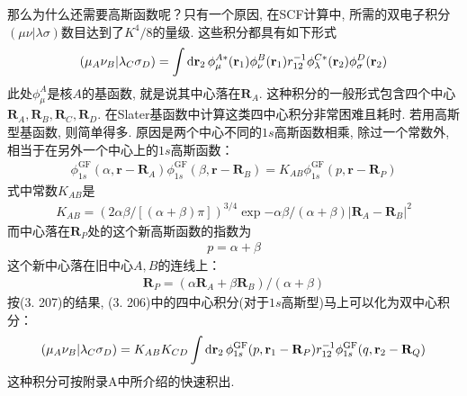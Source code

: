 那么为什么还需要高斯函数呢？只有一个原因, 
在SCF计算中, 
所需的双电子积分$(\mu\nu|\lambda\sigma)$数目达到了$K^4/8$的量级. 
这些积分都具有如下形式
\begin{align}
	(\mu_A\nu_B|\lambda_C\sigma_D) = \int\dd{r}_2\,\phi_\mu^{A*}(\bfr_1)\phi_\nu^B(\bfr_1)\twoe\phi_\lambda^{C*}(\bfr_2)\phi_\sigma^D(\bfr_2)
\end{align}
此处$\phi_\mu^A$是核$A$的基函数, 
就是说其中心落在$\mathbf{R}_A$. 
这种积分的一般形式包含四个中心$\mathbf{R}_A,\mathbf{R}_B,\mathbf{R}_C,\mathbf{R}_D$. 
在Slater基函数中计算这类四中心积分非常困难且耗时. 
若用高斯型基函数, 
则简单得多. 
原因是两个中心不同的$1s$高斯函数相乘, 
除过一个常数外, 
相当于在另外一个中心上的$1s$高斯函数：
\begin{align}
	\label{3.207}
	\phi_{1s}^\mathrm{GF}(\alpha,\mathbf{r-R}_A)\phi_{1s}^\mathrm{GF}(\beta,\mathbf{r-R}_B) = K_{AB}\phi_{1s}^\mathrm{GF}(p,\mathbf{r-R}_P)
\end{align}
式中常数$K_{AB}$是
\begin{align}
	K_{AB} = (2\alpha\beta/[(\alpha+\beta)\pi])^{3/4}\exp{-\alpha\beta/(\alpha+\beta)|\mathbf{R}_A-\mathbf{R}_B|^2}
\end{align}
而中心落在$\mathbf{R}_P$处的这个新高斯函数的指数为
\begin{align}
	p=\alpha+\beta
\end{align}
这个新中心落在旧中心$A,B$的连线上：
\begin{align}
	\mathbf{R}_P = (\alpha\mathbf{R}_A+\beta\mathbf{R}_B)/(\alpha+\beta)
\end{align}
按(3.
207)的结果, 
(3.
206)中的四中心积分(对于$1s$高斯型)马上可以化为双中心积分：
\begin{align}
	(\mu_A\nu_B|\lambda_C\sigma_D) =K_{AB}K_{CD} \int\dd{r}_2\,\phi_{1s}^\mathrm{GF}(p,\bfr_1-\mathbf{R}_P)\twoe\phi_{1s}^\mathrm{GF}(q,\bfr_2-\mathbf{R}_Q)
\end{align}
这种积分可按附录A中所介绍的快速积出.


